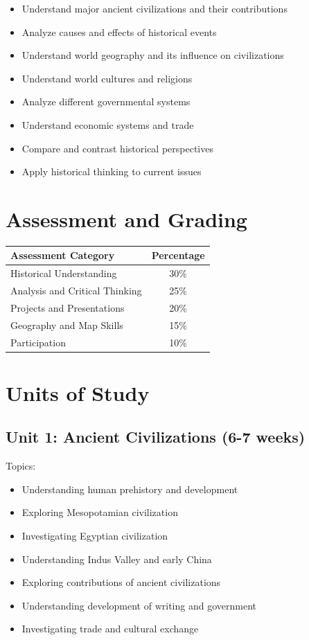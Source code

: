 \documentclass[11pt,letterpaper]{report}
\begin{document}
\begin{itemize}
    \item Understand major ancient civilizations and their contributions
    \item Analyze causes and effects of historical events
    \item Understand world geography and its influence on civilizations
    \item Understand world cultures and religions
    \item Analyze different governmental systems
    \item Understand economic systems and trade
    \item Compare and contrast historical perspectives
    \item Apply historical thinking to current issues
\end{itemize}

\section{Assessment and Grading}

\begin{center}
\begin{tabular}{|l|c|}
\hline
\textbf{Assessment Category} & \textbf{Percentage} \\
\hline
Historical Understanding & 30\% \\
\hline
Analysis and Critical Thinking & 25\% \\
\hline
Projects and Presentations & 20\% \\
\hline
Geography and Map Skills & 15\% \\
\hline
Participation & 10\% \\
\hline
\end{tabular}
\end{center}

\section{Units of Study}

\subsection{Unit 1: Ancient Civilizations (6-7 weeks)}

Topics:
\begin{itemize}
\item Understanding human prehistory and development
\item Exploring Mesopotamian civilization
\item Investigating Egyptian civilization
\item Understanding Indus Valley and early China
\item Exploring contributions of ancient civilizations
\item Understanding development of writing and government
\item Investigating trade and cultural exchange
\end{itemize}
\end{document}

